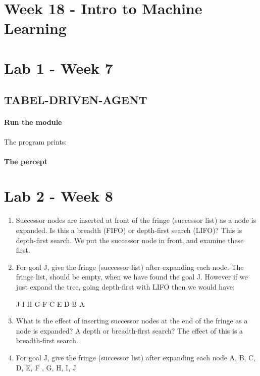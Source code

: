 \documentclass{article}
\begin{document}
\newpage
\section{Week 18 - Intro to Machine Learning}%
\label{sec:}

\newpage
\section{Lab 1 - Week 7}%
\label{sec:lab_week_7}

\subsection{TABEL-DRIVEN-AGENT}%
\label{sub:tabel_driven_agent}

\paragraph{Run the module}
The program prints:

\paragraph{The percept }

\newpage
\section{Lab 2 - Week 8}%
\label{sec:lab_week_8}

\begin{enumerate}
  \item Successor nodes are inserted at front of the fringe (successor list) as
    a node is expanded. Is this a breadth (FIFO) or depth-first search (LIFO)?
    \subitem This is depth-first search. We put the successor node in front, and
    examine these first.

  \item For goal J, give the fringe (successor list) after expanding each node.
    \subitem The fringe list, should be empty, when we have found the goal J.
    However if we just expand the tree, going depth-first with LIFO then we
    would have: 
    \begin{center}
      J I H G F C E D B A 
    \end{center}
  \item What is the effect of inserting successor nodes at the end of the fringe
    as a node is expanded? A depth or breadth-first search?
    \subitem The effect of this is a breadth-first search.
  \item For goal J, give the fringe (successor list) after expanding each node
    \subitem A, B, C, D, E, F , G, H, I, J
\end{enumerate}
\end{document}

